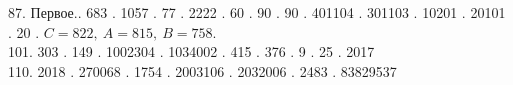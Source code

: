 87. Первое.. 683 . 1057 . 77 . 2222 . 60 . 90 . 90 . 401104 . 301103 . 10201 . 20101 . 20 . $C=822,\ A=815,\ B=758.$ \\ 101. 303 . 149 . 1002304 . 1034002 . 415 . 376 . 9 . 25 . 2017 \\ 110. 2018 . 270068 . 1754 . 2003106 . 2032006 . 2483 . 83829537\\
